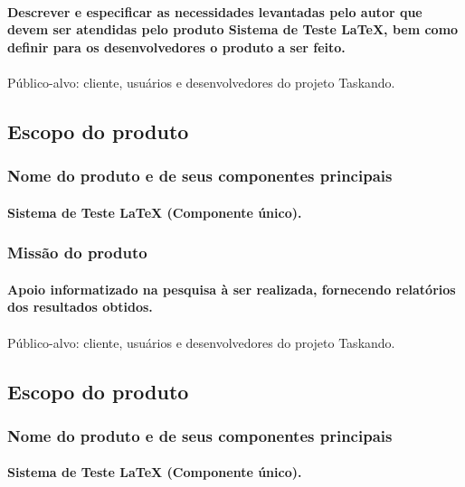 \documentclass{article}
\begin{document}
		\paragraph{Descrever e especificar as necessidades levantadas pelo autor que devem ser atendidas pelo produto Sistema de Teste LaTeX, bem como definir para os desenvolvedores o produto a ser feito.}

\paragraph{}Público-alvo: cliente, usuários e desenvolvedores do projeto Taskando.
	\subsection{Escopo do produto}
		\subsubsection{Nome do produto e de seus componentes principais}
			\paragraph{Sistema de Teste LaTeX (Componente único). }
		\subsubsection{Missão do produto}
			\paragraph{Apoio informatizado na pesquisa à ser realizada, fornecendo relatórios dos resultados obtidos.}
			
\paragraph{}Público-alvo: cliente, usuários e desenvolvedores do projeto Taskando.
	\subsection{Escopo do produto}
		\subsubsection{Nome do produto e de seus componentes principais}
			\paragraph{Sistema de Teste LaTeX (Componente único). }
\end{document}
